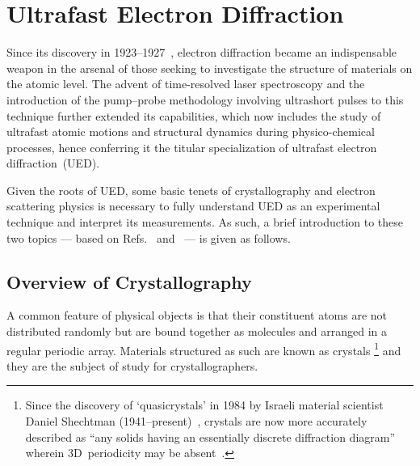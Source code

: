 
\section{Ultrafast Electron Diffraction}
\label{sec: UED}

Since its discovery in 1923--1927~\cite{Gehrenbeck1978}, electron diffraction became
an indispensable weapon in the arsenal of those seeking to
investigate the structure of materials on the atomic level.
%
The advent of time-resolved laser spectroscopy and the introduction of the pump--probe methodology
involving ultrashort pulses to this technique further extended its capabilities,
which now includes the study of ultrafast atomic motions and structural dynamics
during physico-chemical processes,
hence conferring it the titular specialization of ultrafast electron diffraction~(UED).

Given the roots of UED, some basic tenets of crystallography and electron scattering physics
is necessary to fully understand UED as an experimental technique and interpret its measurements.
%
As such, a brief introduction to these two topics ---
based on Refs.~\cite{AshcroftBook, EwaldBook, XRDBook, WarrenBook}
and~\cite{TownsendBook, CowleyBook, ReimerBook, KirklandBook, ZouBook, Giacovazzo2011} ---
is given as follows.

\subsection{Overview of Crystallography}
\label{sec: UED-cryst}

A common feature of physical objects is that
their constituent atoms are not distributed randomly
but are bound together as molecules and arranged in a regular periodic array.
Materials structured as such are known as crystals%
\footnote{Since the discovery of `quasicrystals' in 1984 by Israeli material scientist
Daniel Shechtman (1941--present)~\cite{Shechtman1984}, crystals are now more accurately described as
``any solids having an essentially discrete diffraction diagram''
wherein 3D~periodicity may be absent~\cite{IUC1992}.} and
they are the subject of study for crystallographers.

